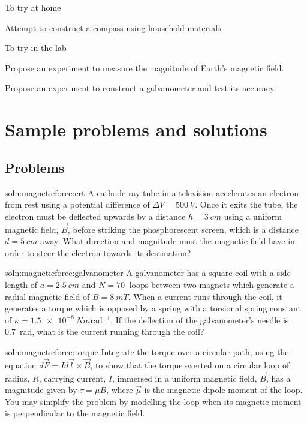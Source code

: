 \begin{chapteractivity}{To try at home}
{
\item Attempt to construct a compass using household materials.
}
\end{chapteractivity}

\begin{chapteractivity}{To try in the lab}
{
\item Propose an experiment to measure the magnitude of Earth's magnetic field.
\item Propose an experiment to construct a galvanometer and test its accuracy.
}
\end{chapteractivity}

\newpage
\section{Sample problems and solutions}

\subsection{Problems}
\begin{problem}{soln:magneticforce:crt}
{\label{prob:magneticforce:crt} 
A cathode ray tube in a television accelerates an electron from rest using a potential difference of $\Delta V=\SI{500}{V}$. Once it exits the tube, the electron must be deflected upwards by a distance $h=\SI{3}{cm}$ using a uniform magnetic field, $\vec B$, before striking the phosphorescent screen, which is a distance $d= \SI{5}{cm}$ away. What direction and magnitude must the magnetic field have in order to steer the electron towards its destination?
}
\end{problem}

\begin{problem}{soln:magneticforce:galvanometer}
{\label{prob:magneticforce:galvanometer} 
A galvanometer has a square coil with a side length of $a=\SI{2.5}{cm}$ and $N=\SI{70}{}$ loops between two magnets which generate a radial magnetic field of $B=\SI{8}{mT}$. When a current runs through the coil, it generates a torque which is opposed by a spring with a torsional spring constant of $\kappa = \SI{1.5e-8}{Nm\radian^{-1}}$. If the deflection of the galvanometer's needle is \SI{0.7}{\radian}, what is the current running through the coil?
}
\end{problem}

\begin{problem}{soln:magneticforce:torque}
{\label{prob:magneticforce:torque} 
Integrate the torque over a circular path, using the equation $d\vec F = Id\vec l \times \vec B$, to show that the torque exerted on a circular loop of radius, $R$, carrying current, $I$, immersed in a uniform magnetic field, $\vec B$, has a magnitude given by $\tau=\mu B$, where $\vec \mu$ is the magnetic dipole moment of the loop. You may simplify the problem by modelling the loop when its magnetic moment is perpendicular to the magnetic field.
}
\end{problem}

